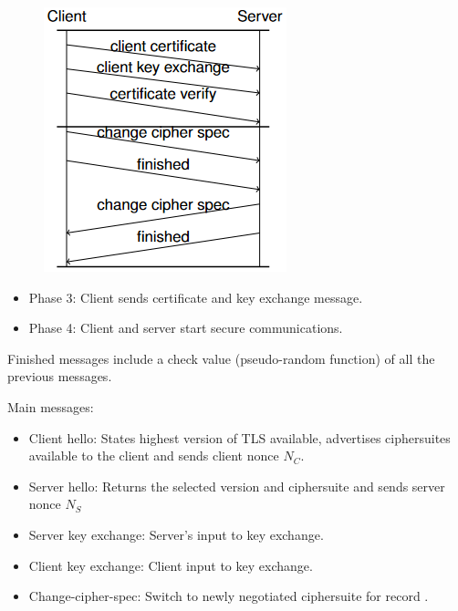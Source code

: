 \documentclass{article}
\begin{document}
\noindent\begin{minipage}{0.54\textwidth}%
\begin{figure}[H]
\begin{center}
\includegraphics[scale=0.7]{Images/tlshandshakephase34.png}
\label{fig:fround}
\end{center}
\end{figure}
\end{minipage}%
\hfill%
\begin{minipage}{0.42\textwidth}
\begin{itemize}
    \item Phase 3: Client sends certificate and key exchange message.
    \item Phase 4: Client and server start secure communications.
\end{itemize}
Finished messages include a check value (pseudo-random function) of all the previous messages.
\end{minipage}

Main messages:
\begin{itemize}
    \item Client hello: States highest version of TLS available, advertises ciphersuites available to the client and sends client nonce $N_C$.
    \item Server hello: Returns the selected version and ciphersuite and sends server nonce $N_S$ 
    \item Server key exchange: Server’s input to key exchange.
    \item Client key exchange: Client input to key exchange.
    \item Change-cipher-spec: Switch to newly negotiated ciphersuite for record .
\end{itemize}
\end{document}
